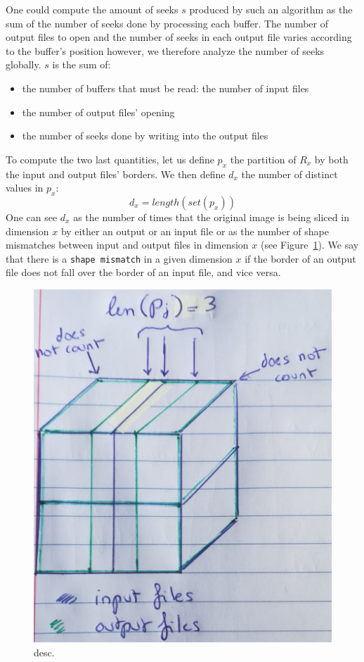 \documentclass[conference]{IEEEtran}
\begin{document}
One could compute the amount of seeks $s$ produced by such an algorithm as the
sum of the number of seeks done by processing each buffer. The number of output
files to open and the number of seeks in each output file varies
according to the buffer's position however, we therefore analyze the number of
seeks globally. $s$ is the sum of:
\begin{itemize}
  \item the number of buffers that must be read: the number of input files
  \item the number of output files' opening
  \item the number of seeks done by writing into the output files
\end{itemize}

To compute the two last quantities, let us define $p_x$ the partition of $R_x$
by both the input and output files' borders. We then define $d_x$ the number of
distinct values in $p_x$:
$$d_x=length(set(p_x))$$
One can see $d_x$ as the number of times that the original image is being sliced
in dimension $x$ by either an output or an input file or as the number of shape
mismatches between input and output files in dimension $x$ (see Figure~\ref{fig:p}).
We say that there is a \texttt{shape mismatch} in a given dimension $x$ if
the border of an output file does not fall over the border of an input file, and
vice versa.

\begin{figure}[h]
\centering
\includegraphics[scale=0.15]{./figures/new/p.jpeg}
\caption{desc.}
\label{fig:p}
\end{figure}
\end{document}
